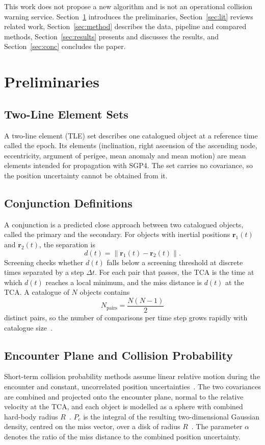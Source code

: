 \documentclass[runningheads]{llncs}
\begin{document}
This work does not propose a new algorithm and is not an operational collision warning service. Section~\ref{sec:prelim} introduces the preliminaries, Section~\ref{sec:lit} reviews related work, Section~\ref{sec:method} describes the data, pipeline and compared methods, Section~\ref{sec:results} presents and discusses the results, and Section~\ref{sec:conc} concludes the paper.

\section{Preliminaries}
\label{sec:prelim}

\subsection{Two-Line Element Sets}
A two-line element (TLE) set describes one catalogued object at a reference time called the epoch. Its elements (inclination, right ascension of the ascending node, eccentricity, argument of perigee, mean anomaly and mean motion) are mean elements intended for propagation with SGP4. The set carries no covariance, so the position uncertainty cannot be obtained from it.

\subsection{Conjunction Definitions}
A conjunction is a predicted close approach between two catalogued objects, called the primary and the secondary. For objects with inertial positions $\mathbf{r}_1(t)$ and $\mathbf{r}_2(t)$, the separation is
\begin{equation}
d(t) = \lVert \mathbf{r}_1(t) - \mathbf{r}_2(t) \rVert .
\label{eq:dist}
\end{equation}
Screening checks whether $d(t)$ falls below a screening threshold at discrete times separated by a step $\Delta t$. For each pair that passes, the TCA is the time at which $d(t)$ reaches a local minimum, and the miss distance is $d(t)$ at the TCA. A catalogue of $N$ objects contains
\begin{equation}
N_{\mathrm{pairs}} = \frac{N(N-1)}{2}
\label{eq:pairs}
\end{equation}
distinct pairs, so the number of comparisons per time step grows rapidly with catalogue size~\cite{b9}.

\subsection{Encounter Plane and Collision Probability}
Short-term collision probability methods assume linear relative motion during the encounter and constant, uncorrelated position uncertainties~\cite{b10}. The two covariances are combined and projected onto the encounter plane, normal to the relative velocity at the TCA, and each object is modelled as a sphere with combined hard-body radius $R$~\cite{b10,b11}. $P_c$ is the integral of the resulting two-dimensional Gaussian density, centred on the miss vector, over a disk of radius $R$~\cite{b11}. The parameter $\alpha$ denotes the ratio of the miss distance to the combined position uncertainty.
\end{document}
